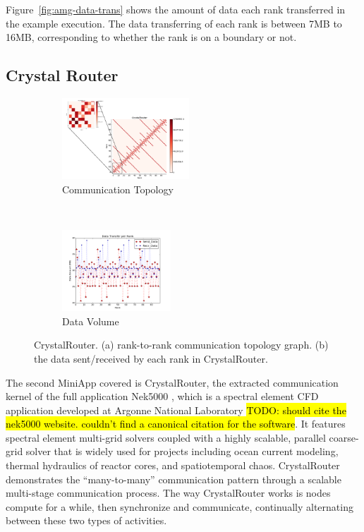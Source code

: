 \documentclass[conference]{IEEEtran}
\newcommand{\TODO}[1]{\hl{TODO: #1}}
\begin{document}
Figure~\ref{fig:amg-data-trans} shows the amount of data each rank transferred in the example execution. The data transferring of each rank is between 7MB to 16MB, corresponding to whether the rank is on a boundary or not.

\subsection{Crystal Router}
\label{sec:crystalrouter}

\begin{figure}[t!]
    \centering
    \begin{subfigure}[t]{0.22\textwidth}
        \centering
        \includegraphics[height=1.2in]{figs/appstudy/cr/cr_pip}
        \caption{Communication Topology}
        \label{fig:cr-communication-topology}
    \end{subfigure}
    ~
    \begin{subfigure}[t]{0.22\textwidth}
        \centering
        \includegraphics[height=1.2in]{figs/appstudy/cr/cr_data_transfer}
        \caption{Data Volume}
        \label{fig:cr-data-trans}
    \end{subfigure}
    \caption{CrystalRouter. (a) rank-to-rank communication topology graph. (b) the data sent/received by each rank in CrystalRouter. }
\end{figure}

The second MiniApp covered is CrystalRouter, the extracted communication kernel of the full application Nek5000 \cite{crystalrouter}, which is a spectral element CFD application developed at Argonne National Laboratory \TODO{should cite the nek5000 website. couldn't find a canonical citation for the software}. It features spectral element multi-grid solvers coupled with a highly scalable, parallel coarse-grid solver that is widely used for projects including ocean current modeling, thermal hydraulics of reactor cores, and spatiotemporal chaos. CrystalRouter demonstrates the ``many-to-many'' communication pattern through a scalable multi-stage communication process. The way CrystalRouter works is nodes compute for a while, then synchronize and communicate, continually alternating between these two types of activities.
\end{document}
